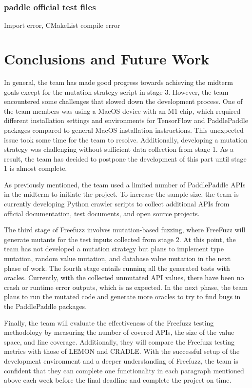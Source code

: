 \documentclass[sigconf]{acmart}
\begin{document}
  \subsubsection{paddle official test files}
  Import error, CMakeList compile error


\section{Conclusions and Future Work}
In general, the team has made good progress towards achieving the midterm goals except for the mutation strategy script in stage 3. However, the team encountered some challenges that slowed down the development process. One of the team members was using a MacOS device with an M1 chip, which required different installation settings and environments for TensorFlow and PaddlePaddle packages compared to general MacOS installation instructions. This unexpected issue took some time for the team to resolve. Additionally, developing a mutation strategy was challenging without sufficient data collection from stage 1. As a result, the team has decided to postpone the development of this part until stage 1 is almost complete.
\par As previously mentioned, the team used a limited number of PaddlePaddle APIs in the midterm to initiate the project. To increase the sample size, the team is currently developing Python crawler scripts to collect additional APIs from official documentation, test documents, and open source projects.
\par The third stage of Freefuzz involves mutation-based fuzzing, where FreeFuzz will generate mutants for the test inputs collected from stage 2. At this point, the team has not developed a mutation strategy but plans to implement type mutation, random value mutation, and database value mutation in the next phase of work. The fourth stage entails running all the generated tests with oracles. Currently, with the collected unmutated API values, there have been no crash or runtime error outputs, which is as expected. In the next phase, the team plans to run the mutated code and generate more oracles to try to find bugs in the PaddlePaddle packages.
\par Finally, the team will evaluate the effectiveness of the Freefuzz testing methodology by measuring the number of covered APIs, the size of the value space, and line coverage. Additionally, they will compare the Freefuzz testing metrics with those of LEMON and CRADLE.
With the successful setup of the development environment and a deeper understanding of Freefuzz, the team is confident that they can complete one functionality in each paragraph mentioned above each week before the final deadline and complete the project on time.
\end{document}
